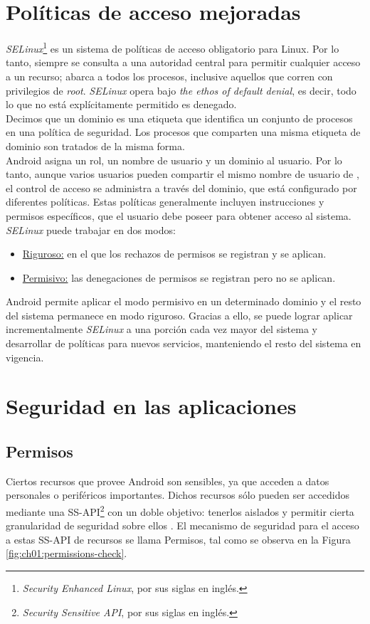 \section{Políticas de acceso mejoradas}
\emph{SELinux}\footnote{\textit{Security Enhanced Linux}, por sus siglas en inglés.} es un sistema de políticas de acceso obligatorio para Linux. Por lo tanto, siempre se consulta a una autoridad central para permitir cualquier acceso a un recurso; abarca a todos los procesos, inclusive aquellos que corren con privilegios de \textit{root}. \emph{SELinux} opera bajo \textit{the ethos of default denial}, es decir, todo lo que no está explícitamente permitido es denegado.\\

Decimos que un dominio es una etiqueta que identifica un conjunto de procesos en una política de seguridad. Los procesos que comparten una misma etiqueta de dominio son tratados de la misma forma. \\

Android asigna un rol, un nombre de usuario y un dominio al usuario. Por lo tanto, aunque varios usuarios pueden compartir el mismo nombre de usuario de , el control de acceso se administra a través del dominio, que está configurado por diferentes políticas. Estas políticas generalmente incluyen instrucciones y permisos específicos, que el usuario debe poseer para obtener acceso al sistema.\\

\emph{SELinux} puede trabajar en dos modos:
\begin{itemize}
    \item \underline{Riguroso:} en el que los rechazos de permisos se registran y se aplican.
    \item \underline{Permisivo:} las denegaciones de permisos se registran pero no se aplican.
\end{itemize} 
Android permite aplicar el modo permisivo en un determinado dominio y el resto del sistema permanece en modo riguroso. Gracias a ello, se puede lograr aplicar incrementalmente \emph{SELinux} a una porción cada vez mayor del sistema y desarrollar de políticas para nuevos servicios, manteniendo el resto del sistema en vigencia.
\section{Seguridad en las aplicaciones}
\subsection{Permisos} \label{ch01-permisos}
Ciertos recursos que provee Android son sensibles, ya que acceden a datos personales o periféricos importantes. Dichos recursos sólo pueden ser accedidos mediante una SS-API\footnote{\textit{Security Sensitive API}, por sus siglas en inglés.} con un doble objetivo: tenerlos aislados y permitir cierta granularidad de seguridad sobre ellos \cite{HYGZD2014}. El mecanismo de seguridad para el acceso a estas SS-API de recursos se llama Permisos, tal como se observa en la Figura \ref{fig:ch01:permissions-check}.\\


